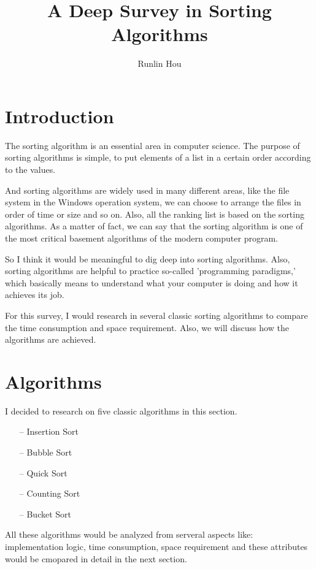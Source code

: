 \documentclass[12pt]{article}
\begin{document}
\title{A Deep Survey in Sorting Algorithms}

\author{Runlin Hou}

\maketitle

\tableofcontents

\newpage
\section{Introduction}
The sorting algorithm is an essential area in computer science. The purpose of sorting algorithms is simple, to put elements of a list in a certain order according to the values. 

And sorting algorithms are widely used in many different areas, like the file system in the Windows operation system, we can choose to arrange the files in order of time or size and so on. Also, all the ranking list is based on the sorting algorithms. As a matter of fact, we can say that the sorting algorithm is one of the most critical basement algorithms of the modern computer program.

So I think it would be meaningful to dig deep into sorting algorithms. Also, sorting algorithms are helpful to practice so-called   'programming paradigms,' which basically means to understand what your computer is doing and how it achieves its job.

For this survey, I would research in several classic sorting algorithms to compare the time consumption and space requirement. Also, we will discuss how the algorithms are achieved.

\section{Algorithms}

I decided to research on five classic algorithms in this section.

\begin{itemize}
    \item[--] Insertion Sort
    \item[--] Bubble Sort
    \item[--] Quick Sort
    \item[--] Counting Sort
    \item[--] Bucket Sort  
\end{itemize}

All these algorithms would be analyzed from serveral aspects like: implementation logic,
time consumption, space requirement and these attributes would be cmopared in detail in
the next section.
\end{document}
